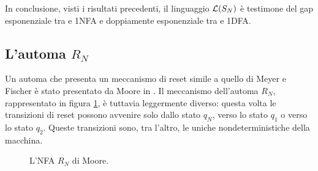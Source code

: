 In conclusione, visti i risultati precedenti, il linguaggio $\mathcal L(S_N)$ è testimone del gap esponenziale tra  e 1NFA e doppiamente esponenziale tra  e 1DFA.


\subsection{L'automa \texorpdfstring{$R_N$}{R con N}}
Un automa che presenta un meccanismo di reset simile a quello di Meyer e Fischer è stato presentato da Moore in \cite{Moore:71:automatabounds}. Il meccanismo dell'automa $R_N$, rappresentato in figura \ref{img:wit:Rn}, è tuttavia leggermente diverso: questa volta le transizioni di reset possono avvenire solo dallo stato $q_N$, verso lo stato $q_1$ o verso lo stato $q_2$. Queste transizioni sono, tra l'altro, le uniche nondeterministiche della macchina.

\begin{figure}
	\centering
	
	\caption{L'NFA $R_N$ di Moore.}
	\label{img:wit:Rn}
\end{figure}

